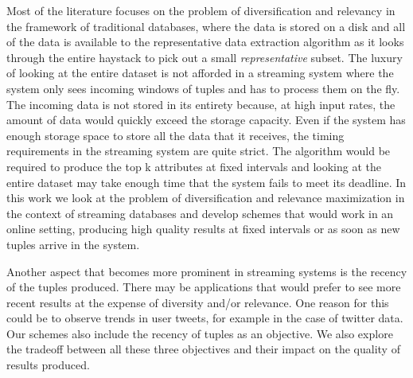 Most of the literature focuses on the problem of diversification and relevancy in the framework of traditional databases, where the data is stored on a disk and all of the data is available to the representative data extraction algorithm as it looks through the entire haystack to pick out a small \textit{representative} subset. The luxury of looking at the entire dataset is not afforded in a streaming system where the system only sees incoming windows of tuples and has to process them on the fly. The incoming data is not stored in its entirety because, at high input rates, the amount of data would quickly exceed the storage capacity. Even if the system has enough storage space to store all the data that it receives, the timing requirements in the streaming system are quite strict. The algorithm would be required to produce the top k attributes at fixed intervals and looking at the entire dataset may take enough time that the system fails to meet its deadline. In this work we look at the problem of diversification and relevance maximization in the context of streaming databases and develop schemes that would work in an online setting, producing high quality results at fixed intervals or as soon as new tuples arrive in the system.

Another aspect that becomes more prominent in streaming systems is the recency of the tuples produced. There may be applications that would prefer to see more recent results at the expense of diversity and/or relevance. One reason for this could be to observe trends in user tweets, for example in the case of twitter data. Our schemes also include the recency of tuples as an objective. We also explore the tradeoff between all these three objectives and their impact on the quality of results produced. 